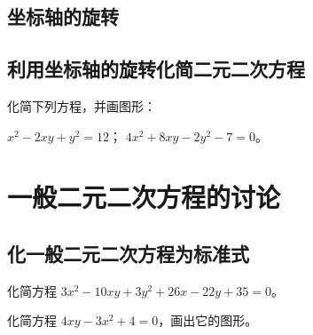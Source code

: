 \subsection{坐标轴的旋转}
\begin{Practice}
  \begin{question}
    \item 
    \item 
    \item 
  \end{question}
\end{Practice}
\subsection{利用坐标轴的旋转化简二元二次方程}
\begin{Practice}
  化简下列方程，并画图形：
  \begin{tasks}
    \task $x^2-2xy+y^2=12$；
    \task $4x^2+8xy-2y^2-7=0$。
  \end{tasks}
\end{Practice}
\begin{Exercise}
  \begin{question}
    \item 
    \item 
    \item 
    \item 
    \item 
    \item 
    \item 
  \end{question}
\end{Exercise}

\section{一般二元二次方程的讨论}
\subsection{化一般二元二次方程为标准式}
\begin{Practice}
  \begin{question}
    \item 化简方程 $3x^2-10xy+3y^2+26x-22y+35=0$。
    \item 化简方程 $4xy-3x^2+4=0$，画出它的图形。
  \end{question}
\end{Practice}
